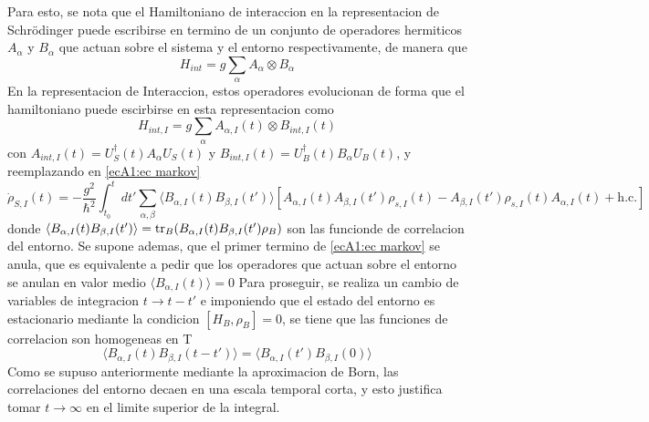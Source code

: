 Para esto, se nota que el Hamiltoniano de interaccion en la representacion de Schrödinger puede escribirse en termino de un conjunto de operadores hermiticos ${A_\alpha}$ y ${B_\alpha}$ que actuan sobre el sistema y el entorno respectivamente, de manera que 
\begin{equation}
    H_{int}=g\sum_\alpha A_\alpha\otimes B_\alpha
\end{equation}
En la representacion de Interaccion, estos operadores evolucionan de forma que el hamiltoniano puede escirbirse en esta representacion como
\begin{equation}
    H_{int,I}=g\sum_\alpha A_{\alpha,I}(t)\otimes B_{int,I}(t)
\end{equation}
con $A_{int,I}(t)=U^\dagger_S(t)A_\alpha U_S(t)$ y $B_{int,I}(t)=U^\dagger_B(t)B_\alpha U_B(t)$, y reemplazando en \ref{ecA1:ec markov}
\begin{equation}
    \dot \rho_{S,I}(t)=-\frac{g^2}{\hbar^2}\int_{t_0}^{t}dt'\sum_{\alpha,\beta}\langle B_{\alpha,I}(t)B_{\beta,I}(t') \rangle [A_{\alpha,I}(t)A_{\beta,I}(t')\rho_{s,I}(t)-A_{\beta,I}(t')\rho_{s,I}(t)A_{\alpha,I}(t) + \text{h.c.}]
\end{equation}
donde $\langle B_{\alpha,I}(t)B_{\beta,I}(t') \rangle = \tr_B( B_{\alpha,I}(t)B_{\beta,I}(t') \rho_B)$ son las funcionde de correlacion del entorno. Se supone ademas, que el primer termino de \ref{ecA1:ec markov} se anula, que es equivalente a pedir que los operadores que actuan sobre el entorno se anulan en valor medio $\langle B_{\alpha,I}(t) \rangle =0$
Para proseguir, se realiza un cambio de variables de integracion $t \rightarrow t-t'$ e imponiendo que el estado del entorno es estacionario mediante la condicion $[H_B,\rho_B]=0$, se tiene que las funciones de correlacion son homogeneas en T
\begin{equation}
    \langle B_{\alpha,I}(t)B_{\beta,I}(t-t') \rangle = \langle B_{\alpha,I}(t')B_{\beta,I}(0) \rangle
\end{equation}
Como se supuso anteriormente mediante la aproximacion de Born, las correlaciones del entorno decaen en una escala temporal corta, y esto justifica tomar $t\rightarrow \infty$ en el limite superior de la integral.

